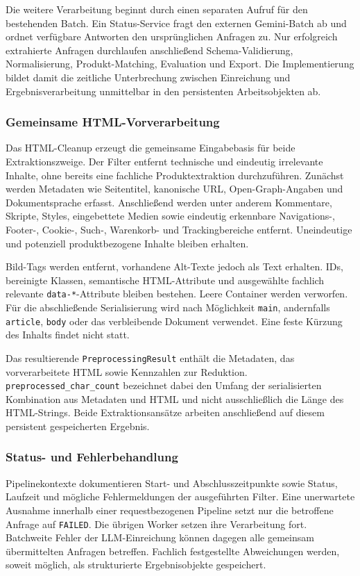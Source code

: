 Die weitere Verarbeitung beginnt durch einen separaten Aufruf für den bestehenden Batch. Ein Status-Service fragt den externen Gemini-Batch ab und ordnet verfügbare 
Antworten den ursprünglichen Anfragen zu. Nur erfolgreich extrahierte Anfragen durchlaufen anschließend Schema-Validierung, Normalisierung, Produkt-Matching, Evaluation 
und Export. Die Implementierung bildet damit die zeitliche Unterbrechung zwischen Einreichung und Ergebnisverarbeitung unmittelbar in den persistenten Arbeitsobjekten ab.

\subsubsection{Gemeinsame HTML-Vorverarbeitung}

Das HTML-Cleanup erzeugt die gemeinsame Eingabebasis für beide Extraktionszweige. Der Filter entfernt technische und eindeutig irrelevante Inhalte, ohne bereits eine 
fachliche Produktextraktion durchzuführen. Zunächst werden Metadaten wie Seitentitel, kanonische URL, Open-Graph-Angaben und Dokumentsprache erfasst. Anschließend werden 
unter anderem Kommentare, Skripte, Styles, eingebettete Medien sowie eindeutig erkennbare Navigations-, Footer-, Cookie-, Such-, Warenkorb- und Trackingbereiche entfernt. 
Uneindeutige und potenziell produktbezogene Inhalte bleiben erhalten.

Bild-Tags werden entfernt, vorhandene Alt-Texte jedoch als Text erhalten. IDs, bereinigte Klassen, semantische HTML-Attribute und ausgewählte fachlich relevante 
\texttt{data-*}-Attribute bleiben bestehen. Leere Container werden verworfen. Für die abschließende Serialisierung wird nach Möglichkeit \texttt{main}, andernfalls 
\texttt{article}, \texttt{body} oder das verbleibende Dokument verwendet. Eine feste Kürzung des Inhalts findet nicht statt.

Das resultierende \texttt{PreprocessingResult} enthält die Metadaten, das vorverarbeitete HTML sowie Kennzahlen zur Reduktion. \texttt{preprocessed\_char\_count} 
bezeichnet dabei den Umfang der serialisierten Kombination aus Metadaten und HTML und nicht ausschließlich die Länge des HTML-Strings. Beide Extraktionsansätze arbeiten 
anschließend auf diesem persistent gespeicherten Ergebnis.

\subsubsection{Status- und Fehlerbehandlung}

Pipelinekontexte dokumentieren Start- und Abschlusszeitpunkte sowie Status, Laufzeit und mögliche Fehlermeldungen der ausgeführten Filter. Eine unerwartete Ausnahme 
innerhalb einer requestbezogenen Pipeline setzt nur die betroffene Anfrage auf \texttt{FAILED}. Die übrigen Worker setzen ihre Verarbeitung fort. Batchweite Fehler der 
LLM-Einreichung können dagegen alle gemeinsam übermittelten Anfragen betreffen. Fachlich festgestellte Abweichungen werden, soweit möglich, als strukturierte Ergebnisobjekte 
gespeichert.

